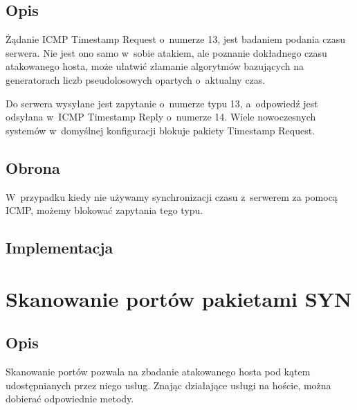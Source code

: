 \documentclass[a4paper,12pt,oneside]{book}
\begin{document}
		\subsection{Opis}
			Żądanie ICMP Timestamp Request o~numerze 13, jest badaniem podania czasu serwera.
			Nie jest ono samo w~sobie atakiem, ale poznanie dokładnego czasu atakowanego hosta, może ułatwić złamanie algorytmów bazujących na generatorach liczb pseudolosowych opartych o~aktualny czas.
			
			Do serwera wysyłane jest zapytanie o~numerze typu 13, a~odpowiedź jest odsyłana w~ICMP Timestamp Reply o~numerze 14. Wiele nowoczesnych systemów w~domyślnej konfiguracji blokuje pakiety Timestamp Request.
		\subsection{Obrona}
			W~przypadku kiedy nie używamy synchronizacji czasu z~serwerem za pomocą ICMP, możemy blokować zapytania tego typu.
		\subsection{Implementacja}
			\footnotesize
			\normalsize
	\section{Skanowanie portów pakietami SYN}
		\label{sec:syn_scan}
		\subsection{Opis}
			Skanowanie portów pozwala na zbadanie atakowanego hosta pod kątem udostępnianych przez niego usług. Znając działające usługi na hoście, można dobierać odpowiednie metody.		
			
\end{document}
